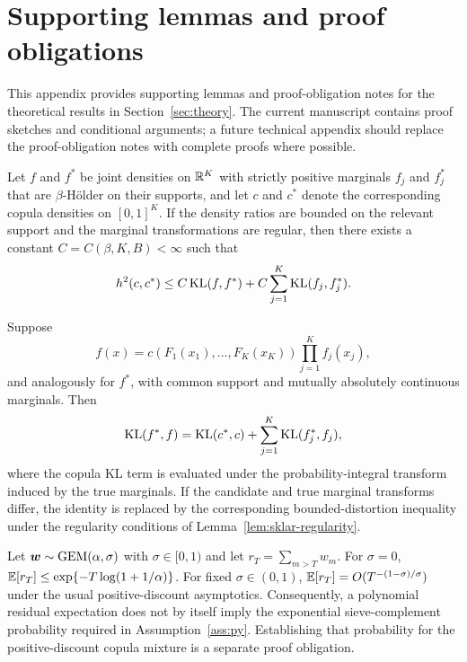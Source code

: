 \beginappendix

\section{Supporting lemmas and proof obligations}
\label{app:lemmas}

This appendix provides supporting lemmas and proof-obligation notes for the theoretical results in Section~\ref{sec:theory}. The current manuscript contains proof sketches and conditional arguments; a future technical appendix should replace the proof-obligation notes with complete proofs where possible.

\begin{lemma}
\label{lem:sklar-regularity}
Let $f$ and $f^*$ be joint densities on $\mathbb{R}^K$ with strictly positive marginals $f_j$ and $f_j^*$ that are $\beta$-H\"older on their supports, and let $c$ and $c^*$ denote the corresponding copula densities on $[0,1]^K$. If the density ratios are bounded on the relevant support and the marginal transformations are regular, then there exists a constant $C=C(\beta,K,B)<\infty$ such that
\[
h^2(c,c^*) \leq C\,\mathrm{KL}(f,f^*) + C\sum_{j=1}^K\mathrm{KL}(f_j,f_j^*).
\]
\end{lemma}

\begin{lemma}
\label{lem:mixent}
Suppose
\[
f(x)=c(F_1(x_1),\ldots,F_K(x_K))\prod_{j=1}^K f_j(x_j),
\]
and analogously for $f^*$, with common support and mutually absolutely continuous marginals. Then
\[
\mathrm{KL}(f^*,f)
=\mathrm{KL}(c^*,c) + \sum_{j=1}^K \mathrm{KL}(f_j^*,f_j),
\]
where the copula KL term is evaluated under the probability-integral transform induced by the true marginals. If the candidate and true marginal transforms differ, the identity is replaced by the corresponding bounded-distortion inequality under the regularity conditions of Lemma~\ref{lem:sklar-regularity}.
\end{lemma}

\begin{lemma}
\label{lem:pytruncation}
Let $\bm{w}\sim\mathrm{GEM}(\alpha,\sigma)$ with $\sigma\in[0,1)$ and let $r_T=\sum_{m>T}w_m$. For $\sigma=0$, $\mathbb{E}[r_T]\leq\exp\{-T\log(1+1/\alpha)\}$. For fixed $\sigma\in(0,1)$, $\mathbb{E}[r_T]=O(T^{-(1-\sigma)/\sigma})$ under the usual positive-discount asymptotics. Consequently, a polynomial residual expectation does not by itself imply the exponential sieve-complement probability required in Assumption~\ref{ass:py}. Establishing that probability for the positive-discount copula mixture is a separate proof obligation.
\end{lemma}

